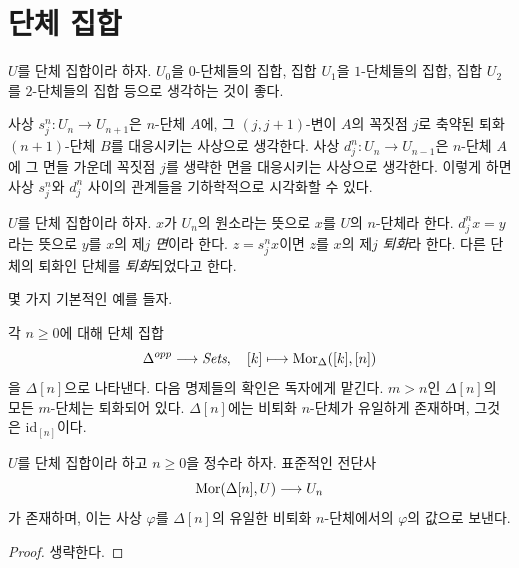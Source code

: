\section{단체 집합}
\label{section-simplicial-set}

\noindent
$U$를 단체 집합이라 하자. $U_0$을 {$0$-단체들의 집합},
집합 $U_1$을 {$1$-단체들의 집합}, 집합 $U_2$를
{$2$-단체들의 집합} 등으로 생각하는 것이 좋다.

\medskip\noindent
사상 $s^n_j : U_n \to U_{n + 1}$은 $n$-단체 $A$에,
그 $(j, j + 1)$-변이 $A$의 꼭짓점 $j$로 축약된 퇴화
$(n + 1)$-단체 $B$를 대응시키는 사상으로 생각한다.
사상 $d^n_j : U_n \to U_{n - 1}$은 $n$-단체 $A$에 그 면들 가운데
꼭짓점 $j$를 생략한 면을 대응시키는 사상으로 생각한다.
이렇게 하면 사상 $s^n_j$와 $d^n_j$ 사이의 관계들을
기하학적으로 시각화할 수 있다.

\begin{definition}
\label{definition-terminology-simplicial-sets}
$U$를 단체 집합이라 하자.
$x$가 $U_n$의 원소라는 뜻으로 $x$를 {$U$의 $n$-단체}라 한다.
$d^n_jx = y$라는 뜻으로 $y$를 $x$의 제$j$ {\it 면}이라 한다.
$z = s^n_jx$이면 $z$를 $x$의 제$j$ {\it 퇴화}라 한다.
다른 단체의 퇴화인 단체를 {\it 퇴화}되었다고 한다.
\end{definition}

\noindent
몇 가지 기본적인 예를 들자.

\begin{example}
\label{example-simplex-simplicial-set}
각 $n \geq 0$에 대해 단체 집합
$$
\Delta^{opp} \longrightarrow \textit{Sets},\quad
[k] \longmapsto \mathop{\mathrm{Mor}}\nolimits_{\Delta}([k], [n])
$$
을 $\Delta[n]$으로 나타낸다. 다음 명제들의 확인은 독자에게 맡긴다.
$m > n$인 $\Delta[n]$의 모든 $m$-단체는 퇴화되어 있다.
$\Delta[n]$에는 비퇴화 $n$-단체가 유일하게 존재하며,
그것은 $\text{id}_{[n]}$이다.
\end{example}

\begin{lemma}
\label{lemma-simplex-map}
$U$를 단체 집합이라 하고 $n \geq 0$을 정수라 하자.
표준적인 전단사
$$
\mathop{\mathrm{Mor}}\nolimits(\Delta[n], U)
\longrightarrow
U_n
$$
가 존재하며, 이는 사상 $\varphi$를 $\Delta[n]$의 유일한 비퇴화
$n$-단체에서의 $\varphi$의 값으로 보낸다.
\end{lemma}

\begin{proof}
생략한다.
\end{proof}

